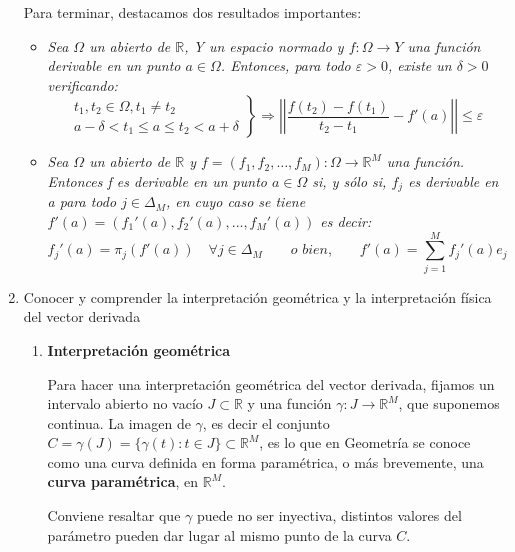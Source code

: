 \documentclass[a4paper, 12pt]{article}
\begin{document}
\begin{enumerate}[label=\textbf{\arabic*}.]
Para terminar, destacamos dos resultados importantes:

\begin{itemize}
	\item \textit{Sea \(\Omega\) un abierto de \(\mathbb{R}\), Y un espacio normado y \(f: \Omega \to Y\) una función derivable en un punto \(a \in \Omega\). Entonces, para todo \(\varepsilon > 0\), existe un \(\delta > 0\) verificando:}
	\begin{equation}\label{derivada_1}
	\left.
	\begin{array}{c}
	t_1, t_2 \in \Omega, t_1 \neq t_2 \\
	a - \delta < t_1 \leq a \leq t_2 < a + \delta
	\end{array}
	\right\} \Rightarrow \left| \left| \frac{f(t_2)-f(t_1)}{t_2-t_1} - f'(a) \right| \right| \leq \varepsilon
	\end{equation}
	
	\item \textit{Sea \(\Omega\) un abierto de \(\mathbb{R}\) y \(f = (f_1, f_2, \dotsc, f_M): \Omega \to \mathbb{R}^M\) una función. Entonces f es derivable en un punto \(a \in \Omega\) si, y sólo si, \(f_j\) es derivable en a para todo \(j \in \Delta_M\), en cuyo caso se tiene \(f'(a) = (f_1'(a),f_2'(a), \dotsc, f_M'(a))\) es decir:}
	\begin{equation} \label{derivada_2}
	f_j'(a) = \pi_j (f'(a)) \quad \forall j \in \Delta_M \qquad \textit{o bien,} \qquad f'(a) = \sum_{j=1}^{M} f_j'(a) e_j
	\end{equation}
\end{itemize}
\bigskip

\item Conocer y comprender la interpretación geométrica y la interpretación física del vector derivada

\begin{enumerate}
	\item \textbf{Interpretación geométrica}
	
Para hacer una interpretación geométrica del vector derivada, fijamos un intervalo abierto no vacío \(J \subset \mathbb{R}\) y una función \(\gamma: J \to \mathbb{R}^M\), que suponemos continua. La imagen de \(\gamma\), es decir el conjunto \(C = \gamma (J) = \{ \gamma(t) : t \in J\} \subset \mathbb{R}^M\), es lo que en Geometría se conoce como una curva definida en forma paramétrica, o más brevemente, una \textbf{curva paramétrica}, en \(\mathbb{R}^M\).

Conviene resaltar que \(\gamma\) puede no ser inyectiva, distintos valores del parámetro pueden dar lugar al mismo punto de la curva \(C\). 


\end{enumerate}
\end{enumerate}
\end{document}
